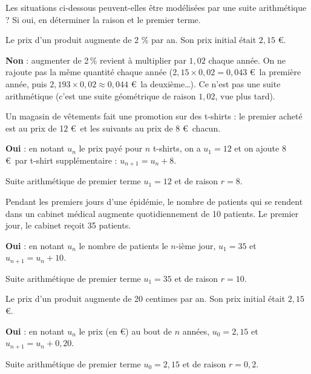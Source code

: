 \documentclass[12pt,a4paper]{book}
\begin{document}
\exerciceDS{}

Les situations ci-dessous peuvent-elles être modélisées par une suite arithmétique ? Si oui, en déterminer la raison et le premier terme.
\begin{enumMet}
	\item Le prix d'un produit augmente de 2 \% par an. Son prix initial était $2,15$ \euro.

	\begin{corrBox}
		\textbf{Non} : augmenter de 2\,\% revient à multiplier par $1,02$ chaque année. On ne rajoute pas la même quantité chaque année ($2,15\times 0,02=0,043$ \euro\ la première année, puis $2,193\times 0,02\approx 0,044$ \euro\ la deuxième\dots). Ce n'est pas une suite arithmétique (c'est une suite géométrique de raison $1,02$, vue plus tard).
	\end{corrBox}
	\item Un magasin de vêtements fait une promotion sur des t-shirts : le premier acheté est au prix de 12 \euro\ et les suivants au prix de 8 \euro\ chacun.

	\begin{corrBox}
		\textbf{Oui} : en notant $u_n$ le prix payé pour $n$ t-shirts, on a $u_1=12$ et on ajoute $8$ \euro\ par t-shirt supplémentaire : $u_{n+1}=u_n+8$.

		Suite arithmétique de premier terme $u_1=12$ et de raison $r=8$.
	\end{corrBox}
	\item Pendant les premiers jours d'une épidémie, le nombre de patients qui se rendent dans un cabinet médical augmente quotidiennement de 10 patients. Le premier jour, le cabinet reçoit 35 patients.

	\begin{corrBox}
		\textbf{Oui} : en notant $u_n$ le nombre de patients le $n$-ième jour, $u_1=35$ et $u_{n+1}=u_n+10$.

		Suite arithmétique de premier terme $u_1=35$ et de raison $r=10$.
	\end{corrBox}
	\item Le prix d'un produit augmente de 20 centimes par an. Son prix initial était $2,15$ \euro.

	\begin{corrBox}
		\textbf{Oui} : en notant $u_n$ le prix (en \euro) au bout de $n$ années, $u_0=2,15$ et $u_{n+1}=u_n+0,20$.

		Suite arithmétique de premier terme $u_0=2,15$ et de raison $r=0,2$.
	\end{corrBox}
\end{enumMet}
\end{document}
